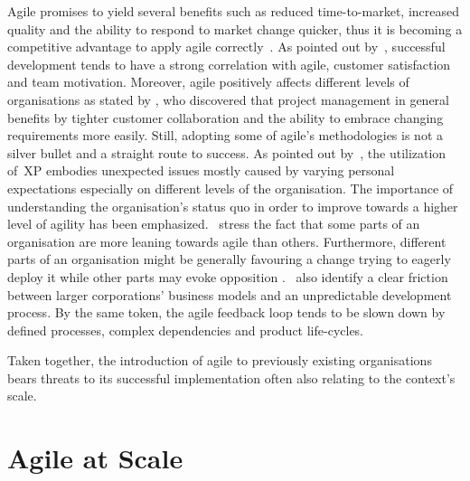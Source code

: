 Agile promises to yield several benefits such as reduced time-to-market, increased quality and the ability to respond to market change quicker, thus it is becoming a competitive advantage to apply agile correctly~\citep{schwaber2007agile}. 
As pointed out by~\citet{cardozo2010scrumproductivity}, successful development tends to have a strong correlation with agile, customer satisfaction and team motivation. Moreover, agile positively affects different levels of organisations as stated by \citet{ceschi2005projman}, who discovered that project management in general benefits by tighter customer collaboration and the ability to embrace changing requirements more easily.
Still, adopting some of agile's methodologies is not a silver bullet and a straight route to success. As pointed out by~\citet{grenning2001xp}, the utilization of~\ac{XP} embodies unexpected issues mostly caused by varying personal expectations especially on different levels of the organisation. The importance of understanding the organisation's status quo in order to improve towards a higher level of agility has been emphasized.~\citet{kettunen2008agileorg} stress the fact that some parts of an organisation are more leaning towards agile than others. Furthermore, different parts of an organisation might be generally favouring a change trying to eagerly deploy it while other parts may evoke opposition \citep{cohn2003introducingagiletoanorganisation}.~\citet{kettunen2008agileorg} also identify a clear friction between larger corporations' business models and an unpredictable development process. By the same token, the agile feedback loop tends to be slown down by defined processes, complex dependencies and product life-cycles.

Taken together, the introduction of agile to previously existing organisations bears threats to its successful implementation often also relating to the context's scale.

\section{Agile at Scale}


